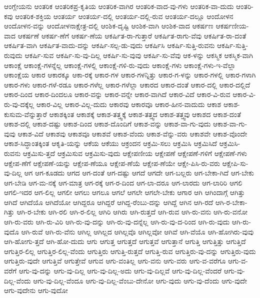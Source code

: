 {ಆಂಗ್ಲೇಯನು
ಆಂತರಿಕ
ಆಂತರಿಕಪ್ರ-ಕೃತಿಯ
ಆಂತರಿಕ-ವಾಗಿರ
ಆಂತರಿಕ-ವಾದ-ವು-ಗಳು
ಆಂತರಿಕ-ವಾ-ದುದು
ಆಂತರಿ-ಕವು
ಆಂತರಿಕ-ಶಕ್ತಿಯ
ಆಂತರ್ಯ
ಆಂತರ್ಯ-ದಲ್ಲಿ
ಆಂತರ್ಯ-ದಲ್ಲಿ-ರುವ
ಆಂತರ್ಯ-ದಲ್ಲೂ
ಆಂದೋಳನ
ಆಂದೋಳನ-ವನ್ನು
ಆಂದೋಳನಾಕ್ಷೇತ್ರ-ದಲ್ಲಿ
ಆಂಶಿಕ-ದೃಷ್ಟಿ
ಆಂಶಿಕ-ವಾಗಿ
ಆಂಶಿಕ-ವಾದ
ಆಕರ್ಷಣ
ಆಕರ್ಷಣೀಯ-ವಾದ
ಆಕರ್ಷಣೆ
ಆಕರ್ಷ-ಣೆಗೆ
ಆಕರ್ಷ-ಣೆಯ
ಆಕರ್ಷಿತ-ರಾ-ಗುತ್ತಾರೆ
ಆಕರ್ಷಿತ-ರಾಗು-ವೆವು
ಆಕರ್ಷಿತ-ರಾ-ದಂತೆ
ಆಕರ್ಷಿತ-ವಾಗಿ
ಆಕರ್ಷಿತ-ವಾದು-ದನ್ನು
ಆಕರ್ಷಿ-ಸಲ್ಪ-ಡು-ವುದು
ಆಕರ್ಷಿಸಿ
ಆಕರ್ಷಿ-ಸುತ್ತಿ-ರುವನು
ಆಕರ್ಷಿ-ಸುತ್ತಿ-ರುವುದು
ಆಕರ್ಷಿ-ಸುವ
ಆಕರ್ಷಿ-ಸು-ವು-ದಿಲ್ಲ
ಆಕರ್ಷಿ-ಸು-ವುವು
ಆಕರ್ಷಿ-ಸು-ವೆವು
ಆಕ-ಳನ್ನು
ಆಕಸ್ಮಿಕ
ಆಕಸ್ಮಿಕ-ವಾಗಿ
ಆಕಾಂಕ್ಷೆ
ಆಕಾಂಕ್ಷೆ-ಗಳನ್ನೆಲ್ಲ
ಆಕಾಂಕ್ಷೆ-ಗಳಲ್ಲಿ
ಆಕಾಂಕ್ಷೆ-ಗಳಿ-ರು-ವುದು
ಆಕಾಂಕ್ಷೆ-ಗಳು
ಆಕಾಂಕ್ಷೆ-ಗಳು-ಇ-ವೆಲ್ಲಾ
ಆಕಾಂಕ್ಷೆಯ
ಆಕಾರ
ಆಕಾರಕ್ಕೂ
ಆಕಾ-ರಕ್ಕೆ
ಆಕಾರ-ಗಳ
ಆಕಾರ-ಗಳನ್ನಿತ್ತು
ಆಕಾರ-ಗ-ಳನ್ನು
ಆಕಾರ-ಗಳಲ್ಲಿ
ಆಕಾರ-ಗಳಾಗಿ
ಆಕಾರ-ಗಳು
ಆಕಾರ-ಗಳೆ-ರಡೂ
ಆಕಾರ-ಗಳೆಲ್ಲ
ಆಕಾರ-ಗಳೆಲ್ಲಾ
ಆಕಾರದ
ಆಕಾರ-ದಂತೆ
ಆಕಾರ-ದಲ್ಲಿ
ಆಕಾರ-ದಲ್ಲಿದೆ
ಆಕಾರ-ದಿಂದ
ಆಕಾರ-ದಿಂದಲೂ
ಆಕಾರ-ವನ್ನು
ಆಕಾರ-ವನ್ನೇ
ಆಕಾರ-ವಾಗಿದೆ
ಆಕಾರ-ವಿದೆ
ಆಕಾರ-ವಿ-ರುವ
ಆಕಾರ-ವಿ-ರು-ವು-ದಕ್ಕೆಲ್ಲ
ಆಕಾರ-ವಿಲ್ಲ
ಆಕಾರ-ವಿಲ್ಲ-ದುದು
ಆಕಾರವು
ಆಕಾರವೂ
ಆಕಾರ-ಹೀನ-ವಾದುದು
ಆಕಾಶ
ಆಕಾಶ-ಕುಸುಮ-ವೆನ್ನುತ್ತಾರೆ
ಆಕಾಶಕ್ಕಿಂತ
ಆಕಾಶಕ್ಕೆ
ಆಕಾಶ-ತತ್ತ್ವಕ್ಕೆ
ಆಕಾಶ-ತತ್ತ್ವದ
ಆಕಾಶ-ತತ್ತ್ವವು
ಆಕಾಶದ
ಆಕಾಶ-ದಂತೆ
ಆಕಾಶ-ದಲ್ಲಿ
ಆಕಾಶ-ದಷ್ಟು
ಆಕಾಶ-ದಿಂದ
ಆಕಾಶ-ದೊಂದಿಗೆ
ಆಕಾಶ-ವನ್ನು
ಆಕಾಶ-ವಾ-ಗು-ವುದು
ಆಕಾಶ-ವಾ-ಗು-ವುವು
ಆಕಾಶ-ವಿದೆ
ಆಕಾಶವು
ಆಕಾಶವೂ
ಆಕಾಶವೆ
ಆಕಾಶ-ವೆಂದು
ಆಕಾಶ-ವೆನ್ನು-ವರು
ಆಕಾಶವೇ
ಆಕಾಶ-ವೊಂದೇ
ಆಕಾಶ-ಸಿದ್ಧಾಂತಕ್ಕಿಂತ
ಆಕೃತಿ-ಯನ್ನು
ಆಕೆಯ
ಆಕೆಯು
ಆಕ್ರಂದನ
ಆಕ್ರಮಿ-ಸಲು
ಆಕ್ರಮಿಸಿ
ಆಕ್ರಮಿಸಿದೆ
ಆಕ್ರಮಿಸಿ-ರುವನು
ಆಕ್ರಮಿಸು-ತ್ತದೆ
ಆಕ್ರಮಿಸುವ
ಆಕ್ರಮಿಸು-ವುದು
ಆಕ್ಷೇಪಣೀಯ
ಆಕ್ಷೇಪಣೆ
ಆಕ್ಷೇಪಣೆ-ಗಳಿಗೆ
ಆಕ್ಷೇಪಣೆ-ಗಳು
ಆಕ್ಷೇಪ-ಣೆಗೆ
ಆಕ್ಷೇಪಣೆ-ಯನ್ನು
ಆಕ್ಷೇಪ-ಣೆಯೂ
ಆಕ್ಷೇಪ-ಣೆಯೆ
ಆಕ್ಷೇಪ-ಣೆಯೇ
ಆಕ್ಷೇ-ಪಿಸಿ-ರು-ವರು
ಆಕ್ಷೇಪಿ-ಸು-ವು-ದಿಲ್ಲ
ಆಗ
ಆಗ-ಕೂಡದು
ಆಗದ
ಆಗ-ದಂತೆ
ಆಗ-ದಷ್ಟು
ಆಗದೆ
ಆಗದೇ
ಆಗ-ಬಲ್ಲರು
ಆಗ-ಬೇಕಾ-ಗಿದೆ
ಆಗ-ಬೇಕು
ಆಗ-ಬೇಡಿ
ಆಗ-ಮ-ನಕ್ಕೆ
ಆಗ-ಮಾತ್ರ
ಆಗ-ರಕ್ಕೆ
ಆಗ-ರ-ದಿಂದ
ಆಗ-ಲಾ-ದರೂ
ಆಗ-ಲಾರದು
ಆಗ-ಲಾರಿರಿ
ಆಗಲಿ
ಆಗಲಿ-ಇದರ
ಆಗ-ಲಿಲ್ಲ
ಆಗಲೀ
ಆಗಲು
ಆಗಲೂ
ಆಗಲೆ
ಆಗಲೇ
ಆಗಲೇ-ಬೇಕು
ಆಗಾರ
ಆಗಿ
ಆಗಿಂದಾಗ್ಗೆ
ಆಗಿತ್ತು
ಆಗಿದೆ
ಆಗಿದೆಯೊ
ಆಗಿದೆಯೋ
ಆಗಿದ್ದರೂ
ಆಗಿದ್ದರೆ
ಆಗಿದ್ದ-ರೆಂಬು-ದನ್ನು
ಆಗಿದ್ದೆ
ಆಗಿನ
ಆಗಿ-ರದೆ
ಆಗಿ-ರ-ಬೇಕಾ-ಗಿತ್ತು
ಆಗಿ-ರ-ಬೇಕು
ಆಗಿ-ರಲಿ
ಆಗಿ-ರ-ಲಿಲ್ಲ
ಆಗಿರಿ
ಆಗಿರು
ಆಗಿ-ರುತ್ತದೆ
ಆಗಿ-ರುವ
ಆಗಿ-ರು-ವನು
ಆಗಿ-ರು-ವನೋ
ಆಗಿ-ರು-ವರು
ಆಗಿ-ರು-ವಿರಿ
ಆಗಿ-ರು-ವು-ದನ್ನು
ಆಗಿ-ರು-ವು-ದನ್ನೆಲ್ಲ
ಆಗಿ-ರು-ವು-ದ-ರಿಂದ
ಆಗಿ-ರು-ವುದು
ಆಗಿ-ರು-ವುದೊ
ಆಗಿ-ರುವೆ
ಆಗಿ-ರು-ವೆನು
ಆಗಿಲ್ಲ
ಆಗಿಲ್ಲದ
ಆಗಿಲ್ಲವೊ
ಆಗಿಲ್ಲವೋ
ಆಗಿವೆ
ಆಗಿ-ವೆಯೊ
ಆಗಿ-ಹೋಗಿರು-ವುವು
ಆಗಿ-ಹೋಗು-ತ್ತದೆ
ಆಗಿ-ಹೋ-ದುದು
ಆಗು
ಆಗುತ್ತ
ಆಗುತ್ತದೆ
ಆಗುತ್ತವೆ
ಆಗುತ್ತಾನೆ
ಆಗುತ್ತಿ
ಆಗುತ್ತಿತ್ತು
ಆಗುತ್ತಿದೆ
ಆಗುತ್ತಿರ-ಲಿಲ್ಲ
ಆಗುತ್ತಿರ-ಲಿಲ್ಲ-ವೆಂದು
ಆಗುತ್ತಿರು
ಆಗುತ್ತಿ-ರುತ್ತದೆ
ಆಗುತ್ತಿ-ರುವ
ಆಗುತ್ತಿರು-ವು-ದನ್ನು
ಆಗುತ್ತಿರು-ವುದು
ಆಗುತ್ತಿರು-ವುದೇ
ಆಗುತ್ತಿವೆ
ಆಗುತ್ತೇವೆ
ಆಗುವ
ಆಗು-ವಂತಿಲ್ಲ
ಆಗು-ವನು
ಆಗು-ವರು
ಆಗು-ವ-ವರೆಗೂ
ಆಗು-ವ-ವರೆಗೆ
ಆಗು-ವು-ದನ್ನು
ಆಗು-ವು-ದಿಲ್ಲ
ಆಗು-ವು-ದಿಲ್ಲ-ಅದು
ಆಗು-ವು-ದಿಲ್ಲವೆ
ಆಗು-ವು-ದಿಲ್ಲ-ವೆಂದರೆ
ಆಗು-ವು-ದಿಲ್ಲ-ವೆಂದು
ಆಗು-ವು-ದಿಲ್ಲ-ವೆಂದೂ
ಆಗು-ವು-ದಿಲ್ಲ-ವೆಂಬು-ದೇನೋ
ಆಗು-ವುದು
ಆಗು-ವು-ದೆಂದು
ಆಗು-ವುದೇ
ಆಗು-ವುದೇನು
ಆಗು-ವುದೋ
}
